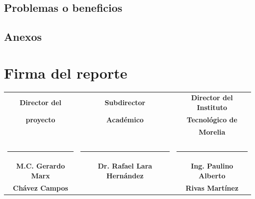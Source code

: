 \documentclass[letterpaper]{elsarticle}
\begin{document}
\subsection{Problemas o beneficios}
\subsection{Anexos}


\section{Firma del reporte}
\begin{center}
\begin{tabular}{ccc}
\bfseries Director del & \bfseries Subdirector  & \bfseries Director del Instituto \\
\bfseries proyecto& \bfseries Académico & \bfseries Tecnológico de \\
\bfseries &\bfseries &\bfseries Morelia\\
\bigskip\\
\bigskip\\
\rule{3.8cm}{0.5pt}&\rule{3.8cm}{0.5pt}&\rule{3.8cm}{0.5pt}\\
\bfseries M.C. Gerardo Marx &\bfseries Dr. Rafael Lara Hernández &\bfseries Ing. Paulino Alberto \\
\bfseries Chávez Campos& &\bfseries Rivas Martínez\\
\end{tabular}
\end{center}

%
\end{document}
